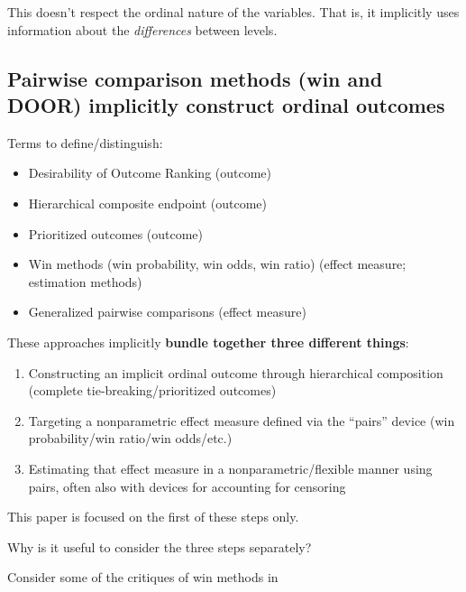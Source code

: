 \documentclass[
  11pt,
  fleqn
]{article}
\begin{document}
This doesn't respect the ordinal nature of the variables. That is, it
implicitly uses information about the \emph{differences} between levels.

\subsection{Pairwise comparison methods (win and DOOR) implicitly construct
ordinal outcomes}

Terms to define/distinguish:
\begin{itemize}
  \item Desirability of Outcome Ranking (outcome)
  \item Hierarchical composite endpoint (outcome)
  \item Prioritized outcomes (outcome)
  \item Win methods (win probability, win odds, win ratio) (effect
    measure; estimation methods)
  \item Generalized pairwise comparisons (effect measure)
\end{itemize}

These approaches implicitly \textbf{bundle together three different things}:
\begin{enumerate}
  \item Constructing an implicit ordinal outcome through
    hierarchical composition (complete tie-breaking/prioritized outcomes)
  \item
    Targeting a nonparametric effect measure defined via the
    ``pairs'' device (win
    probability/win ratio/win odds/etc.)
  \item Estimating that effect measure in a
    nonparametric/flexible manner using pairs, often also with devices for
    accounting for censoring
\end{enumerate}

This paper is focused on the first of these steps only.

Why is it useful to consider the three steps separately?

Consider some of the critiques of win methods in
\citet[e.g.~][]{ajufoFallaciesUsingWin2023}
\end{document}
